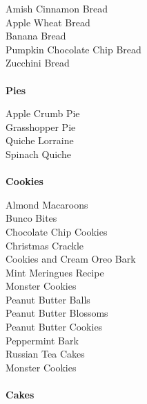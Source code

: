 \documentclass[11pt, twoside, openany]{book}
\begin{document}
Amish Cinnamon Bread\hrulefill\pageref{amish-cinnamon-bread}\\
Apple Wheat Bread\hrulefill\pageref{apple-wheat-bread}\\
Banana Bread\hrulefill\pageref{banana-bread}\\
Pumpkin Chocolate Chip Bread\hrulefill\pageref{pumpkin-chocolate-chip-bread}\\
Zucchini Bread\hrulefill\pageref{zucchini-bread}\\
{~\vspace{2mm}\\ \Large \textbf{Pies}}\hfill\textbf{\pageref{pies}}

Apple Crumb Pie\hrulefill\pageref{apple-crumb-pie}\\
Grasshopper Pie\hrulefill\pageref{grasshopper-pie}\\
Quiche Lorraine\hrulefill\pageref{quiche-lorraine}\\
Spinach Quiche\hrulefill\pageref{spinach-quiche}\\
{~\vspace{2mm}\\ \Large \textbf{Cookies}}\hfill\textbf{\pageref{cookies}}

Almond Macaroons\hrulefill\pageref{almond-macaroons}\\
Bunco Bites\hrulefill\pageref{bunco-bites}\\
Chocolate Chip Cookies\hrulefill\pageref{chocolate-chip-cookies}\\
Christmas Crackle\hrulefill\pageref{christmas-crackle}\\
Cookies and Cream Oreo Bark\hrulefill\pageref{cookies-and-cream-oreo-bark}\\
Mint Meringues Recipe\hrulefill\pageref{mint-meringues-recipe}\\
Monster Cookies\hrulefill\pageref{monster-cookies}\\
Peanut Butter Balls\hrulefill\pageref{peanut-butter-balls}\\
Peanut Butter Blossoms\hrulefill\pageref{peanut-butter-blossoms}\\
Peanut Butter Cookies\hrulefill\pageref{peanut-butter-cookies}\\
Peppermint Bark\hrulefill\pageref{peppermint-bark}\\
Russian Tea Cakes\hrulefill\pageref{russian-tea-cakes}\\
Monster Cookies\hrulefill\pageref{monster-cookies}\\
{~\vspace{2mm}\\ \Large \textbf{Cakes}}\hfill\textbf{\pageref{cakes}}
\end{document}
